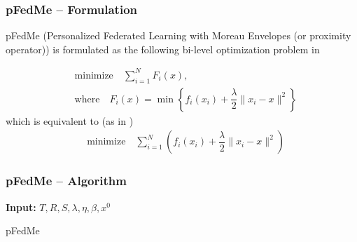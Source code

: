 
\begin{frame}
\frametitle{pFedMe -- Formulation}

pFedMe (Personalized Federated Learning with Moreau Envelopes (or proximity operator)) is formulated as the following bi-level optimization problem in \cite{t2020pfedme}

\begin{align*}
    & \text{minimize} \quad \sum\limits_{i=1}^N F_i(x), \\
    & \text{where} \quad F_i(x) = \min \left\{ f_i(x_i) + \dfrac{\lambda}{2} \lVert x_i - x \rVert^2 \right\}
\end{align*}
which is equivalent to (as in \cite{zhang2015easgd})
\begin{align*}
    & \text{minimize} \quad \sum\limits_{i=1}^N \left( f_i(x_i) + \dfrac{\lambda}{2} \lVert x_i - x \rVert^2 \right)
\end{align*}

\end{frame}


\begin{frame}
\frametitle{pFedMe -- Algorithm}

\begin{algorithm}[H]
\SetAlgoNoLine
\DontPrintSemicolon
{\bfseries Input:} $T,R,S,\lambda,\eta,\beta,x^0$\;
\caption{pFedMe\cite{t2020pfedme}}
\end{algorithm}

\end{frame}


